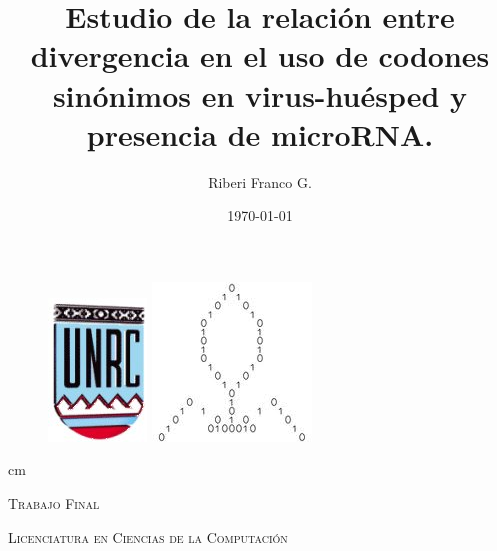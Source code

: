 \documentclass[12pt,a4paper]{report}
\begin{document}

\title{Estudio de la relación entre divergencia en el uso de codones sinónimos en virus-huésped y presencia de microRNA.}
\author{Riberi Franco G.}
\date{\today} 

\maketitle

\newpage
\thispagestyle{empty}

\begin{figure} [h]
	\begin{minipage}{.55\linewidth}
	\centering 
	\includegraphics[scale=0.65]{image/unrc.jpg}
	\end{minipage}
	\begin{minipage}{.45\linewidth}
	\centering 
	\includegraphics[scale=0.65]{image/logo.jpg}
	\end{minipage}
\end{figure}

 cm

\begin{center} \textsc{\normalsize Trabajo Final} \end{center}
\begin{center} \textsc{\normalsize Licenciatura en Ciencias de la Computación} \end{center}
\end{document}
